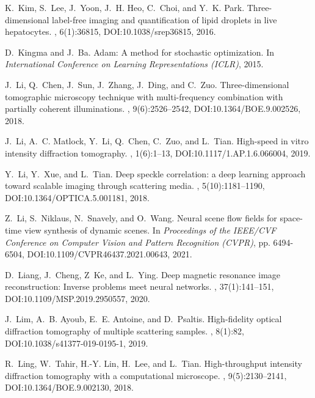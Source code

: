\documentclass[11pt]{article}
\theoremstyle{plain} %
\begin{document}
\begin{thebibliography}{10}
K.~Kim, S.~Lee, J.~Yoon, J.~H. Heo, C.~Choi, and Y.~K. Park.
\newblock Three-dimensional label-free imaging and quantification of lipid
  droplets in live hepatocytes.
, 6(1):36815,
\newblock DOI:10.1038/srep36815,
2016.

D.~Kingma and J.~Ba.
\newblock Adam: {A} method for stochastic optimization.
\newblock In {\em International Conference on Learning Representations (ICLR)},
  2015.

J.~Li, Q.~Chen, J.~Sun, J.~Zhang, J.~Ding, and C.~Zuo.
\newblock Three-dimensional tomographic microscopy technique with multi-frequency combination with partially coherent illuminations.
, 9(6):2526--2542,
\newblock DOI:10.1364/BOE.9.002526,
2018.

J.~Li, A.~C. Matlock, Y.~Li, Q.~Chen, C.~Zuo, and L.~Tian.
\newblock High-speed in vitro intensity diffraction tomography.
, 1(6):1--13,
\newblock DOI:10.1117/1.AP.1.6.066004,
2019.

Y.~Li, Y.~Xue, and L.~Tian.
\newblock Deep speckle correlation: a deep learning approach toward scalable imaging through scattering media.
, 5(10):1181--1190,
\newblock DOI:10.1364/OPTICA.5.001181,
2018.

Z.~Li, S.~Niklaus, N.~Snavely, and O.~Wang.
\newblock Neural scene flow fields for space-time view synthesis of dynamic scenes.
\newblock In {\em Proceedings of the IEEE/CVF Conference on Computer Vision and Pattern Recognition (CVPR)}, pp. 6494-6504,
\newblock DOI:10.1109/CVPR46437.2021.00643, 
2021.

D.~Liang, J.~Cheng, Z~Ke, and L.~Ying.
\newblock Deep magnetic resonance image reconstruction: Inverse problems meet neural networks.
, 37(1):141--151,
\newblock DOI:10.1109/MSP.2019.2950557,
2020.

J.~Lim, A.~B. Ayoub, E.~E. Antoine, and D.~Psaltis.
\newblock High-fidelity optical diffraction tomography of multiple scattering samples.
, 8(1):82,
\newblock DOI:10.1038/s41377-019-0195-1,
2019.

R.~Ling, W.~Tahir, H.-Y. Lin, H.~Lee, and L.~Tian.
\newblock High-throughput intensity diffraction tomography with a computational microscope.
, 9(5):2130--2141,
\newblock DOI:10.1364/BOE.9.002130,
2018.


\end{thebibliography}
\end{document}
